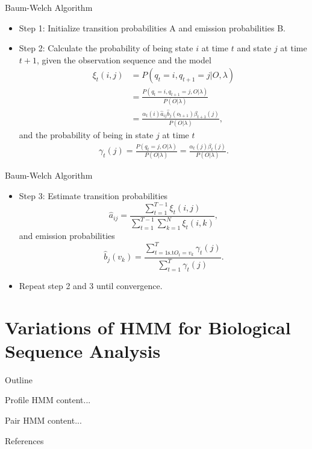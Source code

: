 \documentclass{beamer}
\begin{document}
\begin{frame}{Baum-Welch Algorithm}
	\begin{itemize}
	\item Step 1: Initialize transition probabilities A and emission probabilities B.
	\item Step 2: Calculate the probability of being state $i$ at time $t$ and state $j$ at time $t+1$, given the observation sequence and the model
	\begin{equation}
		\begin{split}
			\xi_t(i,j) & = P(q_t = i, q_{t+1} =j \vert O, \lambda) \\ 
			& =\frac{ P(q_t = i, q_{t+1} =j , O \vert \lambda)}{P(O\vert \lambda)} \\
			& = \frac{\alpha_t(i) \hat{a}_{ij}\hat{b}_j(o_{t+1}) \beta_{t+1}(j)}{P(O\vert \lambda)},
		\end{split}
	\end{equation}
	and the probability of being in state $j$ at time $t$
	\begin{equation}
		\begin{split}
			\gamma_t(j) = \frac{ P(q_t = j, O \vert \lambda)}{P(O\vert \lambda)} = \frac{\alpha_t(j)\beta_t(j)}{P(O\vert \lambda)}.
		\end{split}
	\end{equation}
	\end{itemize}
\end{frame}

\begin{frame}{Baum-Welch Algorithm}
	\begin{itemize}
		\item Step 3: Estimate transition probabilities
		\begin{equation}
			\hat{a}_{ij} = \frac{\sum_{t=1}^{T-1}\xi_t(i,j)}{\sum_{t=1}^{T-1}\sum_{k=1}^{N}\xi_t(i,k)},
		\end{equation}
		and emission probabilities
		\begin{equation}
			\hat{b}_j(v_k) = \frac{\sum_{t=1 \text{s.t} O_t = v_k}^T \gamma_t(j)}{\sum_{t=1}^{T}\gamma_t(j)}.
		\end{equation}
		\item Repeat step 2 and 3 until convergence.
	\end{itemize}
\end{frame}

\section{Variations of HMM for Biological Sequence Analysis}

\begin{frame}{Outline}
	\tableofcontents[currentsection]
\end{frame}

\begin{frame}{Profile HMM}
	content...
\end{frame}

\begin{frame}{Pair HMM}
	content...
\end{frame}
\begin{frame}{References}
	
	
\end{frame}
\end{document}
